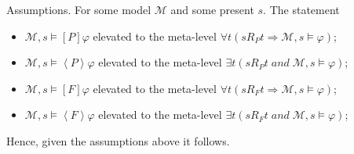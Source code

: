 \documentclass[11pt,a4paper]{article}
\newcommand{\tall}[1]{\left[ #1 \right]}
\newcommand{\tsome}[1]{\left\langle  #1 \right\rangle}
\newcommand{\sand}{\; and \;}
\newcommand{\sto}{\Rightarrow}
\begin{document}
Assumptions. For some model $\mathcal{M}$ and some present $s$. The statement 
\begin{itemize}
\item $\mathcal{M}, s \models \tall{P} \varphi$ elevated to the meta-level $\forall t (sR_Pt \sto \mathcal{M}, s \models \varphi)$;
\item $\mathcal{M}, s \models \tsome{P} \varphi$ elevated to the meta-level $\exists t (sR_Pt \sand \mathcal{M}, s \models \varphi)$;
\item $\mathcal{M}, s \models \tall{F} \varphi$ elevated to the meta-level $\forall t (sR_Ft \sto \mathcal{M}, s \models \varphi)$;
\item $\mathcal{M}, s \models \tsome{F} \varphi$ elevated to the meta-level $\exists t (sR_Ft \sand \mathcal{M}, s \models \varphi)$;
\end{itemize}
Hence, given the assumptions above it follows.
\end{document}
